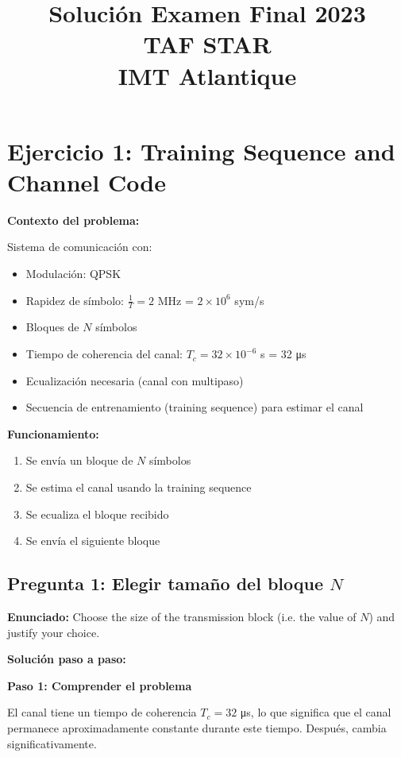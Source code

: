 \documentclass[11pt,a4paper]{article}
\title{\textbf{Soluci\'on Examen Final 2023\\TAF STAR\\IMT Atlantique}}
\author{}
\date{}
\begin{document}
\maketitle

\section*{Ejercicio 1: Training Sequence and Channel Code}

\textbf{Contexto del problema:}

Sistema de comunicaci\'on con:
\begin{itemize}
    \item Modulaci\'on: QPSK
    \item Rapidez de s\'imbolo: $\frac{1}{T} = 2$ MHz = $2 \times 10^6$ sym/s
    \item Bloques de $N$ s\'imbolos
    \item Tiempo de coherencia del canal: $T_c = 32 \times 10^{-6}$ s = 32 μs
    \item Ecualizaci\'on necesaria (canal con multipaso)
    \item Secuencia de entrenamiento (training sequence) para estimar el canal
\end{itemize}

\textbf{Funcionamiento:}
\begin{enumerate}
    \item Se env\'ia un bloque de $N$ s\'imbolos
    \item Se estima el canal usando la training sequence
    \item Se ecualiza el bloque recibido
    \item Se env\'ia el siguiente bloque
\end{enumerate}

\subsection*{Pregunta 1: Elegir tama\~no del bloque $N$}

\textbf{Enunciado:} Choose the size of the transmission block (i.e. the value of $N$) and justify your choice.

\vspace{0.3cm}
\textbf{Soluci\'on paso a paso:}

\textbf{Paso 1: Comprender el problema}

El canal tiene un tiempo de coherencia $T_c = 32$ μs, lo que significa que el canal permanece aproximadamente constante durante este tiempo. Despu\'es, cambia significativamente.
\end{document}
